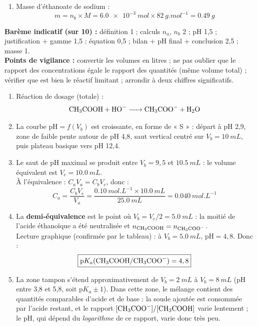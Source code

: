 \documentclass[11pt]{article}
\begin{document}
\begin{corrige}
\begin{enumerate}
\begin{enumerate}
    \end{enumerate}
  \item Masse d'éthanoate de sodium :
  \[
  m = n_b \times M = \SI{6,0e-3}{mol} \times \SI{82}{g.mol^{-1}} = \boxed{\SI{0,49}{g}}
  \]
\end{enumerate}
\textbf{Barème indicatif (sur 10) :} définition 1 ; calculs $n_a$, $n_b$ 2 ; pH 1,5 ; justification + gamme 1,5 ; équation 0,5 ; bilan + pH final + conclusion 2,5 ; masse 1. \\
\textbf{Points de vigilance :} convertir les volumes en litres ; ne pas oublier que le rapport des concentrations égale le rapport des quantités (même volume total) ; vérifier que  est bien le réactif limitant ; arrondir à deux chiffres significatifs.
\end{corrige}

\begin{corrige}
\begin{enumerate}
  \item Réaction de dosage (totale) :
  \[ \ce{CH3COOH + HO- -> CH3COO- + H2O} \]
  \item La courbe $\mathrm{pH} = f(V_b)$ est croissante, en forme de « S » : départ à pH 2,9, zone de faible pente autour de pH 4,8, saut vertical centré sur $V_b = \SI{10}{mL}$, puis plateau basique vers pH 12,4.
  \item Le saut de pH maximal se produit entre $V_b = 9,5$ et $\SI{10,5}{mL}$ : le volume équivalent est $\boxed{V_e = \SI{10,0}{mL}}$. \\
  À l'équivalence : $C_a V_a = C_b V_e$, donc :
  \[
  C_a = \frac{C_b V_e}{V_a} = \frac{\SI{0,10}{mol.L^{-1}} \times \SI{10,0}{mL}}{\SI{25,0}{mL}} = \boxed{\SI{0,040}{mol.L^{-1}}}
  \]
  \item La \textbf{demi-équivalence} est le point où $V_b = V_e/2 = \SI{5,0}{mL}$ : la moitié de l'acide éthanoïque a été neutralisée et $n_{\ce{CH3COOH}} = n_{\ce{CH3COO-}}$. \\
  Lecture graphique (confirmée par le tableau) : à $V_b = \SI{5,0}{mL}$, $\mathrm{pH} = 4,8$. Donc :
  \[
  \boxed{\mathrm{p}K_a(\ce{CH3COOH}/\ce{CH3COO-}) = 4,8}
  \]
  \item La zone tampon s'étend approximativement de $V_b = \SI{2}{mL}$ à $V_b = \SI{8}{mL}$ (pH entre 3,8 et 5,8, soit $\mathrm{p}K_a \pm 1$). Dans cette zone, le mélange contient des quantités comparables d'acide  et de base  : la soude ajoutée est consommée par l'acide restant, et le rapport $[\ce{CH3COO-}]/[\ce{CH3COOH}]$ varie lentement ; le pH, qui dépend du \emph{logarithme} de ce rapport, varie donc très peu.

\end{enumerate}
\end{corrige}
\end{document}
